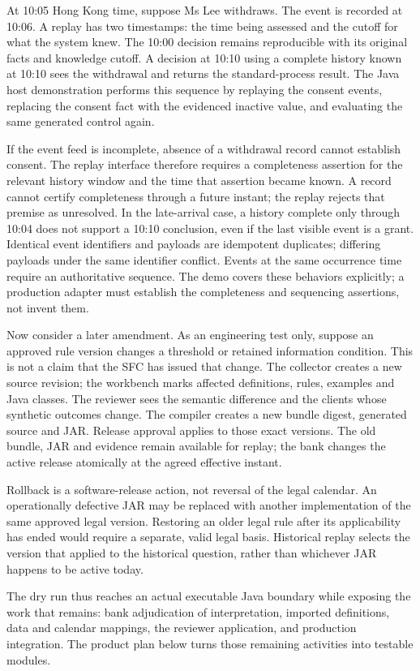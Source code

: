 At 10:05 Hong Kong time, suppose Ms Lee withdraws. The event is recorded at
10:06. A replay has two timestamps: the time being assessed and the cutoff for
what the system knew. The 10:00 decision remains reproducible with its original
facts and knowledge cutoff. A decision at 10:10 using a complete history known
at 10:10 sees the withdrawal and returns the standard-process result.
The Java host demonstration performs this sequence by replaying the consent
events, replacing the consent fact with the evidenced inactive value, and
evaluating the same generated control again.

If the event feed is incomplete, absence of a withdrawal record cannot establish
consent. The replay interface therefore requires a completeness assertion for
the relevant history window and the time that assertion became known. A record cannot certify completeness
through a future instant; the replay rejects that premise as unresolved. In the
late-arrival case, a history complete only through 10:04 does not support a
10:10 conclusion, even if the last visible event is a grant. Identical event
identifiers and payloads are idempotent duplicates; differing payloads under
the same identifier conflict. Events at the same occurrence time require an
authoritative sequence. The demo covers these behaviors explicitly; a production
adapter must establish the completeness and sequencing assertions, not invent
them.

Now consider a later amendment. As an engineering test only, suppose an approved
rule version changes a threshold or retained information condition. This is not
a claim that the SFC has issued that change. The collector creates a new source
revision; the workbench marks affected definitions, rules, examples and Java
classes. The reviewer sees the semantic difference and the clients whose
synthetic outcomes change. The compiler creates a new bundle digest, generated
source and JAR. Release approval applies to those exact versions. The old
bundle, JAR and evidence remain available for replay; the bank changes the
active release atomically at the agreed effective instant.

Rollback is a software-release action, not reversal of the legal calendar.
An operationally defective JAR may be replaced with another implementation of
the same approved legal version. Restoring an older legal rule after its
applicability has ended would require a separate, valid legal basis. Historical
replay selects the version that applied to the historical question, rather
than whichever JAR happens to be active today.

The dry run thus reaches an actual executable Java boundary while exposing
the work that remains: bank adjudication of interpretation, imported definitions,
data and calendar mappings, the reviewer application, and production integration.
The product plan below turns those remaining activities into testable modules.
